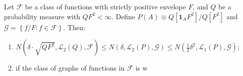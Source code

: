 \begin{lemma}
\label{lem--covering-num-transition}
Let \(\mathcal{F}\) be a class of functions with strictly positive envelope
\(F\), and \(Q\) be a probability measure with \(Q F^{2} < \infty\).
Define \(P (A) \equiv Q \left[ \mathbf{1}_{A} F^{2} \right] / Q \left[ F^{2}
\right]\) and \(\mathcal{G} = \left\{ f / F : f \in \mathcal{F} \right\}\).
Then:
\begin{enumerate}[label=(\roman*)]
  \item \(N \left( \delta \cdot \sqrt{Q F^{2}}, \mathscr{L}_{2} (Q), \mathcal{F}
    \right) \leq N \left( \delta, \mathscr{L}_{2} (P), \mathcal{G} \right) \leq
    N \left( \frac{1}{2} \delta^{2}, \mathscr{L}_{1} (P), \mathcal{G} \right)\);
  \item if the class of graphs of functions in \(\mathcal{F}\) is w
\end{enumerate}
\end{lemma}


